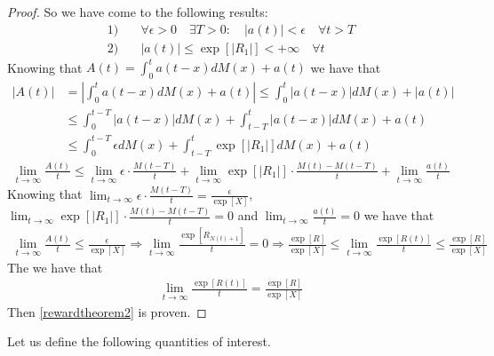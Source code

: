 \begin{proof}
	So we have come to the following results:
	\begin{align*}
		1) \quad & \forall \epsilon>0 \quad \exists T>0:\quad |a(t)|<\epsilon \quad \forall t>T
		\\ 2) \quad & |a(t)| \leq \exp\left[|R_1|\right]<+\infty \quad \forall t
	\end{align*}
	Knowing that $A(t)=\int_{0}^{t}a(t-x)dM(x)+a(t)$ we have that
	\begin{align*}
		|A(t)| & = |\int_{0}^{t}a(t-x)dM(x)+a(t)| \leq \int_{0}^{t}|a(t-x)|dM(x)+|a(t)|
		\\ & \leq \int_{0}^{t-T}|a(t-x)|dM(x)+ \int_{t-T}^{t}|a(t-x)|dM(x) + a(t)
		\\ & \leq \int_{0}^{t-T}\epsilon dM(x)+ \int_{t-T}^{t}\exp\left[|R_1|\right] dM(x) + a(t)
	\end{align*}
	\begin{align*}
		\lim_{t \to \infty} \frac{A(t)}{t} \leq \lim_{t \to \infty} \epsilon \cdot \frac{M(t-T)}{t} + \lim_{t \to \infty} \exp\left[|R_1|\right]\cdot \frac{M(t)-M(t-T)}{t} + \lim_{t \to \infty} \frac{a(t)}{t}
	\end{align*}
	Knowing that $\lim_{t \to \infty} \epsilon \cdot \frac{M(t-T)}{t}=\frac{\epsilon}{\exp[X]}$, $\lim_{t \to \infty} \exp\left[|R_1|\right]\cdot \frac{M(t)-M(t-T)}{t}=0$ and $\lim_{t \to \infty} \frac{a(t)}{t}=0$ we have that
	\begin{align*}
		\lim_{t \to \infty} \frac{A(t)}{t} \leq \frac{\epsilon}{\exp[X]} \Rightarrow \lim_{t \to \infty} \frac{\exp[R_{N(t)+1}]}{t}=0 \Rightarrow \frac {\exp[R]}{\exp[X]} \leq \lim_{t \to \infty} \frac{\exp[R(t)]}{t} \leq \frac{\exp[R]}{\exp[X]}
	\end{align*}
	The we have that
	\begin{align*}
		\lim_{t \to \infty} \frac{\exp[R(t)]}{t} = \frac{\exp[R]}{\exp[X]}
	\end{align*}
	Then \eqref{rewardtheorem2} is proven.
\end{proof}

Let us define the following quantities of interest.

